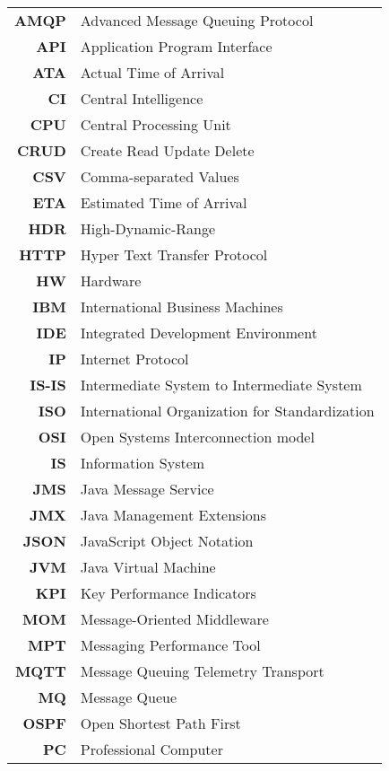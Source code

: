  \begin{longtable}{rl}
    \textbf{AMQP} & Advanced Message Queuing Protocol \\
     \textbf{API} & Application Program Interface \\
     \textbf{ATA} & Actual Time of Arrival \\
     \textbf{CI} & Central Intelligence \\
     \textbf{CPU} & Central Processing Unit \\
     \textbf{CRUD} & Create Read Update Delete \\
     \textbf{CSV} & Comma-separated Values \\
     \textbf{ETA} & Estimated Time of Arrival \\
     \textbf{HDR} & High-Dynamic-Range \\
     \textbf{HTTP} & Hyper Text Transfer Protocol \\
     \textbf{HW} & Hardware \\
     \textbf{IBM} & International Business Machines \\
     \textbf{IDE} & Integrated Development Environment \\
     \textbf{IP} & Internet Protocol \\
     \textbf{IS-IS} & Intermediate System to Intermediate System \\
     \textbf{ISO} & International Organization for Standardization \\
     \textbf{OSI} & Open Systems Interconnection model \\
     \textbf{IS} & Information System \\
     \textbf{JMS} & Java Message Service \\
     \textbf{JMX} & Java Management Extensions \\
     \textbf{JSON} & JavaScript Object Notation \\
     \textbf{JVM} & Java Virtual Machine \\
     \textbf{KPI} & Key Performance Indicators \\
     \textbf{MOM} & Message-Oriented Middleware \\
     \textbf{MPT} & Messaging Performance Tool \\
     \textbf{MQTT} & Message Queuing Telemetry Transport \\
     \textbf{MQ} & Message Queue  \\
     \textbf{OSPF} & Open Shortest Path First \\
     \textbf{PC} & Professional Computer \\

\end{longtable}
